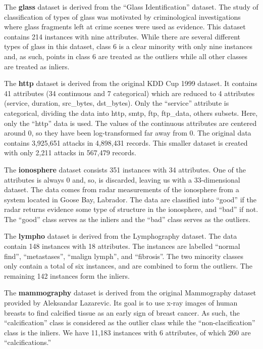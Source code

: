 The \textbf{glass} dataset is derived from the ``Glass Identification'' dataset.
The study of classification of types of glass was motivated by criminological investigations where glass fragments left at crime scenes were used as evidence.
This dataset contains 214 instances with nine attributes.
While there are several different types of glass in this dataset, class 6 is a clear minority with only nine instances and, as such, points in class 6 are treated as the outliers while all other classes are treated as inliers.

The \textbf{http} dataset is derived from the original KDD Cup 1999 dataset.
It contains 41 attributes (34 continuous and 7 categorical) which are reduced to 4 attributes (service, duration, src\_bytes, dst\_bytes).
Only the ``service'' attribute is categorical, dividing the data into {http, smtp, ftp, ftp\_data, others} subsets.
Here, only the ``http'' data is used.
The values of the continuous attributes are centered around 0, so they have been log-transformed far away from 0.
The original data contains 3,925,651 attacks in 4,898,431 records.
This smaller dataset is created with only 2,211 attacks in 567,479 records.

The \textbf{ionosphere} dataset consists 351 instances with 34 attributes.
One of the attributes is always 0 and, so, is discarded, leaving us with a 33-dimensional dataset.
The data comes from radar measurements of the ionosphere from a system located in Goose Bay, Labrador.
The data are classified into ``good'' if the radar returns evidence some type of structure in the ionosphere, and ``bad'' if not.
The ``good'' class serves as the inliers and the ``bad'' class serves as the outliers.

The \textbf{lympho} dataset is derived from the Lymphography dataset.
The data contain 148 instances with 18 attributes.
The instances are labelled ``normal find'', ``metastases'', ``malign lymph'', and ``fibrosis''.
The two minority classes only contain a total of six instances, and are combined to form the outliers.
The remaining 142 instances form the inliers.

The \textbf{mammography} dataset is derived from the original Mammography dataset provided by Aleksandar Lazarevic.
Its goal is to use x-ray images of human breasts to find calcified tissue as an early sign of breast cancer.
As such, the ``calcification'' class is considered as the outlier class while the ``non-clacification'' class is the inliers.
We have 11,183 instances with 6 attributes, of which 260 are ``calcifications.''

